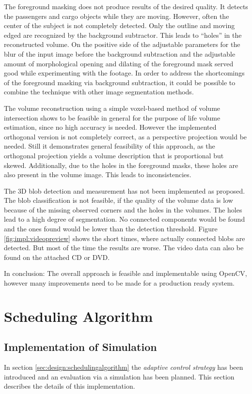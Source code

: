 The foreground masking does not produce results of the desired quality.
It detects the passengers and cargo objects while they are moving.
However, often the center of the subject is not completely detected.
Only the outline and moving edged are recognized by the background subtractor.
This leads to \enquote{holes} in the reconstructed volume.
On the positive side of the adjustable parameters for the blur of the input image before the background subtraction and the adjustable amount of morphological opening and dilating of the foreground mask served good while experimenting with the footage.
In order to address the shortcomings of the foreground masking via background subtraction,
it could be possible to combine the technique with other image segmentation methods.

The volume reconstruction using a simple voxel-based method of volume intersection shows to be feasible in general for the purpose of life volume estimation, since no high accuracy is needed.
However the implemented orthogonal version is not completely correct, as a perspective projection would be needed.
Still it demonstrates general feasibility of this approach, 
as the orthogonal projection yields a volume description that is proportional but skewed.
Additionally, due to the holes in the foreground masks, these holes are also present in the volume image. 
This leads to inconsistencies.

The \ac{3D} blob detection and measurement has not been implemented as proposed.
The blob classification is not feasible, if the quality of the volume data is low because of the missing observed corners and the holes in the volumes.
The holes lead to a high degree of segmentation. No connected components would be found and the ones found would be lower than the detection threshold.
Figure \ref{fig:impl:videopreview} shows the short times, where actually connected blobs are detected. But most of the time the results are worse.
The video data can also be found on the attached CD or DVD.

In conclusion: The overall approach is feasible and implementable using OpenCV, however many improvements need to be made for a production ready system.


\section{Scheduling Algorithm}
\subsection{Implementation of Simulation}
In section \ref{sec:design:schedulingalgorithm} the \emph{adaptive control strategy} has been introduced and an evaluation via a simulation has been planned.
This section describes the details of this implementation.

